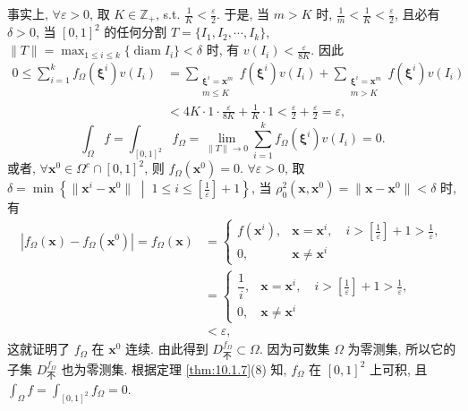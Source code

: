 \begin{example}
事实上, $\forall\varepsilon>0$, 取 $K\in\mathbb{Z}_+$, s.t. $\frac{1}{K}<\frac{\varepsilon}{2}$. 于是, 当 $m>K$ 时, $\frac{1}{m}<\frac{1}{K}<\frac{\varepsilon}{2}$, 且必有 $\delta>0$, 当 $[0,1]^2$ 的任何分割 $T=\{I_1,I_2,\cdots,I_k\}$, $\|T\|=\max_{1\leqslant i\leqslant k}\{\operatorname{diam}I_i\}<\delta$ 时, 有 $v(I_i)<\frac{\varepsilon}{8K}$. 因此
\begin{align*}
0 \leqslant \sum_{i=1}^{k}f_{\Omega}(\boldsymbol{\xi}^i)v(I_i) &= \sum_{\substack{\boldsymbol{\xi}^i=\boldsymbol{x}^m \\ m\leqslant K}}f(\boldsymbol{\xi}^i)v(I_i) + \sum_{\substack{\boldsymbol{\xi}^i=\boldsymbol{x}^m \\ m>K}}f(\boldsymbol{\xi}^i)v(I_i) \\
&< 4K \cdot 1 \cdot \frac{\varepsilon}{8K} + \frac{1}{K} \cdot 1 < \frac{\varepsilon}{2} + \frac{\varepsilon}{2} = \varepsilon,
\end{align*}
\[
\int_{\Omega}f = \int_{[0,1]^2}f_{\Omega} = \lim_{\|T\|\to 0}\sum_{i=1}^{k}f_{\Omega}(\boldsymbol{\xi}^i)v(I_i) = 0.
\]
或者, $\forall\boldsymbol{x}^0\in\Omega^c\cap[0,1]^2$, 则 $f_{\Omega}(\boldsymbol{x}^0)=0$. $\forall\varepsilon>0$, 取 $\delta=\min\left\{\|\boldsymbol{x}^i-\boldsymbol{x}^0\| \;\middle|\; 1\leqslant i\leqslant \left[\frac{1}{\varepsilon}\right]+1\right\}$, 当 $\rho_0^2(\boldsymbol{x},\boldsymbol{x}^0)=\|\boldsymbol{x}-\boldsymbol{x}^0\|<\delta$ 时, 有
\begin{align*}
|f_{\Omega}(\boldsymbol{x})-f_{\Omega}(\boldsymbol{x}^0)| = f_{\Omega}(\boldsymbol{x}) &= \begin{cases}
f(\boldsymbol{x}^i), & \boldsymbol{x}=\boldsymbol{x}^i,\quad i>\left[\frac{1}{\varepsilon}\right]+1>\frac{1}{\varepsilon}, \\
0, & \boldsymbol{x}\neq\boldsymbol{x}^i
\end{cases} \\
&= \begin{cases}
\dfrac{1}{i}, & \boldsymbol{x}=\boldsymbol{x}^i,\quad i>\left[\frac{1}{\varepsilon}\right]+1>\frac{1}{\varepsilon}, \\
0, & \boldsymbol{x}\neq\boldsymbol{x}^i
\end{cases} \\
&< \varepsilon,
\end{align*}
这就证明了 $f_{\Omega}$ 在 $\boldsymbol{x}^0$ 连续. 由此得到 $D_{\text{不}}^{f_{\Omega}} \subset \Omega$. 因为可数集 $\Omega$ 为零测集, 所以它的子集 $D_{\text{不}}^{f_{\Omega}}$ 也为零测集. 根据定理 \ref{thm:10.1.7}(8) 知, $f_{\Omega}$ 在 $[0,1]^2$ 上可积, 且 $\int_{\Omega} f = \int_{[0,1]^2} f_{\Omega} = 0$.
\end{example}

